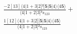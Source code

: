 \documentclass[varwidth, border=5pt]{standalone}
\begin{document}
\begin{my}
$\begin{gathered}
\scriptscriptstyle\frac{-2[13]⟨4|1+3|2]²[𝟓|𝟓|4⟩⟨4𝟓⟩}{⟨4|1+2|3]³s_{123}} +\\
\scriptscriptstyle\frac{1[12]⟨4|1+3|2][𝟓|𝟓|4⟩⟨4𝟓⟩}{⟨4|1+2|3]²s_{123}} \phantom{+}
\end{gathered}$
\end{my}
\end{document}
